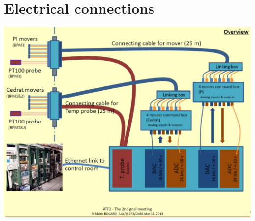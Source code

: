 \documentclass[a4paper,11pt]{book}
\begin{document}
\section{Electrical connections}
\hspace*{1.4cm}\includegraphics[angle=0,scale=0.2]{link.jpg}\par
\end{document}
